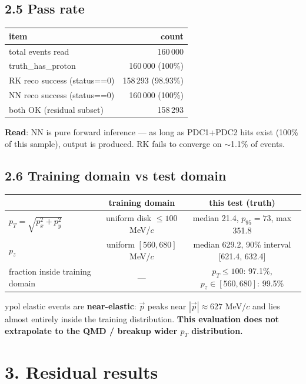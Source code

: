 \documentclass[a4paper,11pt]{article}
\begin{document}
\subsection{2.5 Pass rate}
\begin{table}[H]
\centering\footnotesize
\begin{tabular}{lr}
\toprule
item & count \\
\midrule
total events read              & 160\,000 \\
truth\_has\_proton             & 160\,000 (100\%) \\
RK reco success (status==0)    & 158\,293 (98.93\%) \\
NN reco success (status==0)    & 160\,000 (100\%) \\
both OK (residual subset)      & 158\,293 \\
\bottomrule
\end{tabular}
\end{table}
\textbf{Read}: NN is pure forward inference --- as long as PDC1+PDC2 hits exist (100\% of this sample), output is produced. RK fails to converge on $\sim$1.1\% of events.

\subsection{2.6 Training domain vs test domain}
\begin{table}[H]
\centering\footnotesize
\begin{tabular}{lcc}
\toprule
                                 & training domain   & this test (truth) \\
\midrule
$p_T = \sqrt{p_x^2+p_y^2}$       & uniform disk $\le 100$ MeV/$c$  & median 21.4, $p_{95}=73$, max 351.8 \\
$p_z$                            & uniform $[560, 680]$ MeV/$c$    & median 629.2, 90\% interval [621.4, 632.4] \\
fraction inside training domain  & ---                              & $p_T\le100$: 97.1\%, $p_z\in[560,680]$: 99.5\% \\
\bottomrule
\end{tabular}
\end{table}
ypol elastic events are \textbf{near-elastic}: $\vec p$ peaks near $|\vec p|\approx 627$ MeV/$c$ and lies almost entirely inside the training distribution. \textbf{This evaluation does not extrapolate to the QMD / breakup wider $p_T$ distribution.}

\section{3. Residual results}
\end{document}
